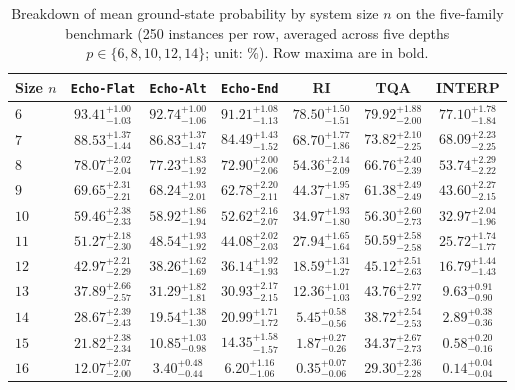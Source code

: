 \documentclass{article}
\theoremstyle{plain}
\theoremstyle{definition}
\begin{document}
\begin{table}[htbp]
\vskip -0.04in
\caption{Breakdown of mean ground-state probability by system size $n$ on the five-family benchmark (250 instances per row, averaged across five depths $p\in\{6,8,10,12,14\}$; unit: \%). Row maxima are in bold.}
\label{tab:d_1}
\vskip 0.01in
\centering
\footnotesize
\renewcommand{\arraystretch}{0.96}
\setlength{\tabcolsep}{4.0pt}
\begin{tabular}{lcccccc}
\toprule
Size $n$ & \texttt{Echo-Flat} & \texttt{Echo-Alt} & \texttt{Echo-End} & RI & TQA & INTERP \\
\midrule
$6$ & $\mathbf{93.41}^{+1.00}_{-1.03}$ & $92.74^{+1.00}_{-1.06}$ & $91.21^{+1.08}_{-1.13}$ & $78.50^{+1.50}_{-1.51}$ & $79.92^{+1.88}_{-2.00}$ & $77.10^{+1.78}_{-1.84}$ \\
$7$ & $\mathbf{88.53}^{+1.37}_{-1.44}$ & $86.83^{+1.37}_{-1.47}$ & $84.49^{+1.43}_{-1.52}$ & $68.70^{+1.77}_{-1.86}$ & $73.82^{+2.10}_{-2.25}$ & $68.09^{+2.23}_{-2.25}$ \\
$8$ & $\mathbf{78.07}^{+2.02}_{-2.04}$ & $77.23^{+1.83}_{-1.92}$ & $72.90^{+2.00}_{-2.06}$ & $54.36^{+2.14}_{-2.09}$ & $66.76^{+2.40}_{-2.39}$ & $53.74^{+2.29}_{-2.22}$ \\
$9$ & $\mathbf{69.65}^{+2.31}_{-2.21}$ & $68.24^{+1.93}_{-2.01}$ & $62.78^{+2.20}_{-2.11}$ & $44.37^{+1.95}_{-1.87}$ & $61.38^{+2.49}_{-2.49}$ & $43.60^{+2.27}_{-2.15}$ \\
$10$ & $\mathbf{59.46}^{+2.38}_{-2.33}$ & $58.92^{+1.86}_{-1.94}$ & $52.62^{+2.16}_{-2.07}$ & $34.97^{+1.93}_{-1.80}$ & $56.30^{+2.60}_{-2.73}$ & $32.97^{+2.04}_{-1.96}$ \\
$11$ & $\mathbf{51.27}^{+2.18}_{-2.30}$ & $48.54^{+1.93}_{-1.92}$ & $44.08^{+2.02}_{-2.03}$ & $27.94^{+1.65}_{-1.64}$ & $50.59^{+2.58}_{-2.58}$ & $25.72^{+1.74}_{-1.77}$ \\
$12$ & $42.97^{+2.21}_{-2.29}$ & $38.26^{+1.62}_{-1.69}$ & $36.14^{+1.92}_{-1.93}$ & $18.59^{+1.31}_{-1.27}$ & $\mathbf{45.12}^{+2.51}_{-2.63}$ & $16.79^{+1.44}_{-1.43}$ \\
$13$ & $37.89^{+2.66}_{-2.57}$ & $31.29^{+1.82}_{-1.81}$ & $30.93^{+2.17}_{-2.15}$ & $12.36^{+1.01}_{-1.03}$ & $\mathbf{43.76}^{+2.77}_{-2.92}$ & $9.63^{+0.91}_{-0.90}$ \\
$14$ & $28.67^{+2.39}_{-2.43}$ & $19.54^{+1.38}_{-1.30}$ & $20.99^{+1.71}_{-1.72}$ & $5.45^{+0.58}_{-0.56}$ & $\mathbf{38.72}^{+2.54}_{-2.53}$ & $2.89^{+0.38}_{-0.36}$ \\
$15$ & $21.82^{+2.38}_{-2.34}$ & $10.85^{+1.03}_{-0.98}$ & $14.35^{+1.58}_{-1.57}$ & $1.87^{+0.27}_{-0.26}$ & $\mathbf{34.37}^{+2.67}_{-2.73}$ & $0.58^{+0.20}_{-0.16}$ \\
$16$ & $12.07^{+2.07}_{-2.00}$ & $3.40^{+0.48}_{-0.44}$ & $6.20^{+1.16}_{-1.06}$ & $0.35^{+0.07}_{-0.06}$ & $\mathbf{29.30}^{+2.36}_{-2.28}$ & $0.14^{+0.04}_{-0.04}$ \\
\bottomrule
\end{tabular}%
\vskip -0.02in
\end{table}
\end{document}
